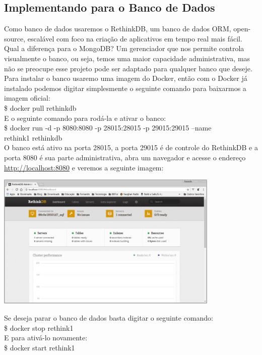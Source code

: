 \documentclass[a4paper,11pt]{article}
\begin{document}
\subsection{Implementando para o Banco de Dados}
Como banco de dados usaremos o RethinkDB, um banco de dados ORM, open-source, escalável com foco na criação de aplicativos em tempo real mais fácil. Qual a diferença para o MongoDB? Um gerenciador que nos permite controla visualmente o banco, ou seja, temos uma maior capacidade administrativa, mas não se preocupe esse projeto pode ser adaptado para qualquer banco que deseje. \\[3mm]
Para instalar o banco usaremo uma imagem do Docker, então com o Docker já instalado podemos digitar simplesmente o seguinte comando para baixarmos a imagem oficial: \\[1mm]
{\ttfamily\$ docker pull rethinkdb} \\[3mm]
E o seguinte comando para rodá-la e ativar o banco: \\[1mm]
{\ttfamily\$ docker run -d -p 8080:8080 -p 28015:28015 -p 29015:29015 --name } \\[1mm]
{\ttfamily rethink1 rethinkdb} \\[3mm]
O banco está ativo na porta 28015, a porta 29015 é de controle do RethinkDB e a porta
8080 é sua parte administrativa, abra um navegador e acesse o endereço 
\url{http://localhost:8080} e veremos a seguinte imagem:
\begin{center} 
\includegraphics[width=0.8\textwidth]{Rethinkdb.png} 
\end{center}
Se deseja parar o banco de dados basta digitar o seguinte comando: \\[1mm]
{\ttfamily\$ docker stop rethink1} \\[3mm]
E para ativá-lo novamente: \\[1mm]
{\ttfamily\$ docker start rethink1}
\end{document}
